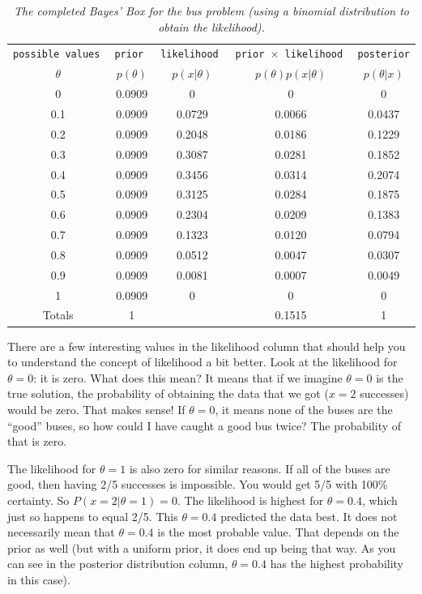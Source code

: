 \begin{table}[ht!]
\begin{center}
\begin{tabular}{|c|c|c|c|c|}
\hline
\tt{possible values} & \tt{prior} & \tt{likelihood} & \tt{prior} $\times$ \tt{likelihood} & \tt{posterior}\\
$\theta$ & $p(\theta)$ & $p(x|\theta)$ & $p(\theta)p(x|\theta)$ & $p(\theta|x)$\\
\hline
0 & 0.0909 & 0 & 0 & 0\\
0.1 & 0.0909 & 0.0729 & 0.0066 & 0.0437\\
0.2 & 0.0909 & 0.2048 & 0.0186 & 0.1229\\
0.3 & 0.0909 & 0.3087 & 0.0281 & 0.1852\\
0.4 & 0.0909 & 0.3456 & 0.0314 & 0.2074\\
0.5 & 0.0909 & 0.3125 & 0.0284 & 0.1875\\
0.6 & 0.0909 & 0.2304 & 0.0209 & 0.1383\\
0.7 & 0.0909 & 0.1323 & 0.0120 & 0.0794\\
0.8 & 0.0909 & 0.0512 & 0.0047 & 0.0307\\
0.9 & 0.0909 & 0.0081 & 0.0007 & 0.0049\\
1 & 0.0909 & 0 & 0 & 0\\
\hline
Totals & 1 & & 0.1515 & 1\\
\hline
\end{tabular}
\caption{\it The completed Bayes' Box for the bus problem
(using a binomial distribution to obtain the likelihood).
\label{tab:bus_bayes_box2}}
\end{center}
\end{table}

There are a few interesting values in the likelihood column that should help you
to understand the concept of likelihood a bit better. Look at the likelihood for
$\theta = 0$: it is zero. What does this mean? It means that if we imagine
$\theta=0$ is the true solution, the probability of obtaining the data that we
got ($x=2$ successes) would be zero. That makes sense! If $\theta=0$, it means
none of the buses are the ``good'' buses, so how could I have caught a
good bus twice? The probability of that is zero.

The likelihood for $\theta=1$ is also zero for similar reasons. If all of the
buses are good, then having 2/5 successes is impossible. You would get 5/5
with 100\% certainty. So $P(x=2|\theta=1) = 0$. The likelihood is highest
for $\theta = 0.4$, which just so happens to equal 2/5. This $\theta=0.4$ predicted
the data best. It does
not necessarily mean that $\theta=0.4$ is the most probable value. That depends
on the prior as well (but with a uniform prior, it does end up being that way.
As you can see in the posterior distribution column, $\theta=0.4$ has the
highest probability in this case).

